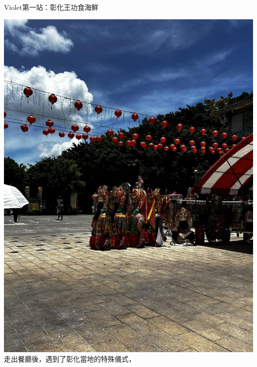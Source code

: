 \documentclass{article}
\begin{document}
\begin{large}
\begin{boxpar}{Violet}{第一站：彰化王功食海鮮}
\begin{tcolorbox}[sidebyside, lefthand width=0.25\textwidth, colback=Violet!50!white, colframe=Violet]
    \includegraphics[width=\linewidth]{gods.jpg}
  \tcblower
  走出餐廳後，遇到了彰化當地的特殊儀式，
  \end{tcolorbox}
\end{boxpar}


\end{large}
\end{document}
